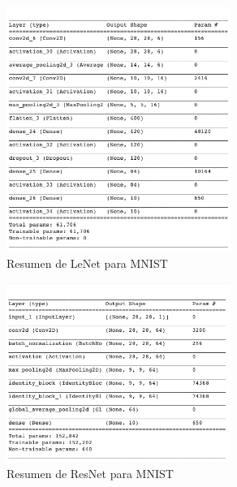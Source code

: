 \begin{figure}[h!]
    \centering
    \includegraphics[width=0.65\textwidth]{images/model_details/mnist_linear_good_summary.png}
    \caption{Resumen de LeNet para MNIST}
    \label{lenet summary}
\end{figure}

\begin{figure}[h!]
    \centering
    \includegraphics[width=0.65\textwidth]{images/model_details/mnist_nonlinear_good_summary.png}
    \caption{Resumen de ResNet para MNIST}
    \label{resnet summary}
\end{figure}

